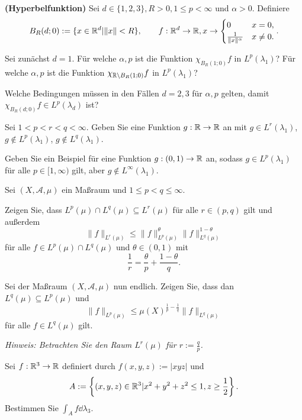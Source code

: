 \begin{Problem}
	\textbf{(Hyperbelfunktion)} Sei $d\in \{1,2,3\} , R>0, 1\le p<\infty$ und $\alpha>0$. Definiere
	\[
	B_R(d;0):=\{x\in \mathbb{R}^d|\|x\|<R\} , \qquad f:\mathbb{R}^d\to \mathbb{R}, x\to \begin{cases}
		0 & x=0,\\
		\frac{1}{\|x\|^\alpha} & x\neq 0.
	\end{cases}
	.\] 
	\begin{parts}
		\item Sei zunächst $d=1$. F\"{u}r welche $\alpha, p$ ist die Funktion $\chi_{B_R(1;0)}f$ in $L^p(\lambda_1)$? F\"{u}r welche $\alpha,p$ ist die Funktion $\chi_{\mathbb{R}\backslash B_R(1;0)}f$ in $L^p(\lambda_1)$?
		\item Welche Bedingungen müssen in den Fällen $d=2,3$ f\"{u}r $\alpha, p$ gelten, damit $\chi_{B_R(d;0)}f\in L^p(\lambda_d)$ ist?
		\item Sei $1<p<r<q<\infty$. Geben Sie eine Funktion $g:\mathbb{R}\to \mathbb{R}$ an mit $g\in L^r(\lambda_1)$, $g \not\in L^p(\lambda_1)$, $g \not\in L^q(\lambda_1)$.
		\item Geben Sie ein Beispiel f\"{u}r eine Funktion $g:(0,1)\to \mathbb{R}$ an, sodass $g\in L^p(\lambda_1)$ f\"{u}r alle $p\in [1,\infty)$ gilt, aber $g \not\in L^\infty(\lambda_1)$.
	\end{parts}
\end{Problem}

\begin{Problem}
	Sei $(X, \mathcal{A},\mu)$ ein Maßraum und $1\le p<q\le\infty$.
	\begin{parts}
	\item Zeigen Sie, dass $L^p(\mu)\cap L^q(\mu)\subseteq L^r(\mu)$ f\"{u}r alle $r\in (p,q)$ gilt und außerdem
		\[
			\|f\|_{L^r(\mu)}\le \|f\|_{L^p(\mu)}^\theta \|f\|_{L^q(\mu)}^{1-\theta}
		\] 
		f\"{u}r alle $f\in L^p(\mu)\cap L^q(\mu)$ und $\theta\in (0,1)$ mit
		\[
		\frac{1}{r}=\frac{\theta}{p}+\frac{1-\theta}{q}
		.\] 
	\item Sei der Maßraum $(X,\mathcal{A},\mu)$ nun endlich. Zeigen Sie, dass dan $L^q(\mu)\subseteq L^p(\mu)$ und
		\[
			\|f\|_{L^p(\mu)}\le \mu(X)^{\frac{1}{p}-\frac{1}{q}}\|f\|_{L^q(\mu)}
		\] 
		f\"{u}r alle $f\in L^q(\mu)$ gilt.

		\emph{Hinweis: Betrachten Sie den Raum $L^r(\mu)$ f\"{u}r $r:=\frac{q}{p}$.}
	\end{parts}
\end{Problem}

\begin{Problem}
	Sei $f:\mathbb{R}^3\to \mathbb{R}$ definiert durch $f(x,y,z):=|xyz|$ und
	\[
		A:=\left\{ (x,y,z)\in \mathbb{R}^3|x^2+y^2+z^2\le 1, z\ge \frac{1}{2} \right\} 
	.\] 
	Bestimmen Sie $\int_A f\dd{\lambda_3}$.
\end{Problem}
